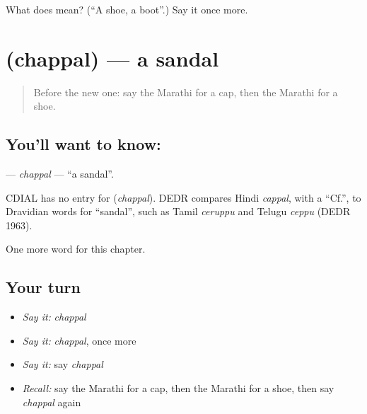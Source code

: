 \begin{tcolorbox}[breakable,colback=teal!4,colframe=teal!35!black,title={Before you move on}]
What does  mean? (\textquotedblleft{}A shoe, a boot\textquotedblright{}.) Say it once more.
\end{tcolorbox}
\section[\texorpdfstring{\mr{चप्पल} (chappal)}{चप्पल (chappal)}]{ (chappal) — a sandal}

\label{lesson:MR-C117-chappal}



\begin{quote}
Before the new one: say the Marathi for a cap, then the Marathi for a shoe.
\end{quote}

\subsection*{You'll want to know: }
\textbf{} — \emph{chappal} — \textquotedblleft{}a sandal\textquotedblright{}.

\begin{cousinweb}
CDIAL has no entry for \textbf{} (\emph{chappal}). DEDR compares Hindi \emph{cappal}, with a \textquotedblleft{}Cf.\textquotedblright{}, to Dravidian words for \textquotedblleft{}sandal\textquotedblright{}, such as Tamil \emph{ceruppu} and Telugu \emph{ceppu} (DEDR 1963).
\end{cousinweb}

\begin{grammarlens}[title={What you've built}]
One more word for this chapter.
\end{grammarlens}

\subsection*{Your turn}
\begin{itemize}
\raggedright
  \item \emph{Say it:} \emph{chappal}
  \item \emph{Say it:} \emph{chappal}, once more
  \item \emph{Say it:} say \emph{chappal}
  \item \emph{Recall:} say the Marathi for a cap, then the Marathi for a shoe, then say \emph{chappal} again
\end{itemize}

